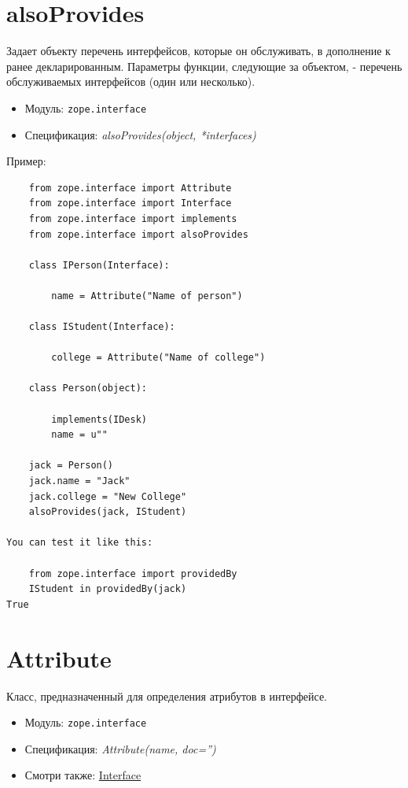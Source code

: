 \documentclass[a4paper,openany,twoside,draft]{book}
\providecommand*{\DUroletitlereference}[1]{\textsl{#1}}
\begin{document}
\section*{alsoProvides%
  \label{alsoprovides}%
}

Задает объекту перечень интерфейсов, которые он обслуживать, в дополнение к ранее декларированным.  Параметры функции, следующие за объектом, - перечень обслуживаемых интерфейсов (один или несколько).

\begin{itemize}

\item Модуль: \texttt{zope.interface}

\item Спецификация: \DUroletitlereference{alsoProvides(object, *interfaces)}

\end{itemize}

Пример:

\begin{verbatim}
    from zope.interface import Attribute
    from zope.interface import Interface
    from zope.interface import implements
    from zope.interface import alsoProvides

    class IPerson(Interface):

        name = Attribute("Name of person")

    class IStudent(Interface):

        college = Attribute("Name of college")

    class Person(object):

        implements(IDesk)
        name = u""

    jack = Person()
    jack.name = "Jack"
    jack.college = "New College"
    alsoProvides(jack, IStudent)

You can test it like this:

    from zope.interface import providedBy
    IStudent in providedBy(jack)
True
\end{verbatim}


\section*{Attribute%
  \label{attribute}%
}

Класс, предназначенный для определения атрибутов в интерфейсе.

\begin{itemize}

\item Модуль: \texttt{zope.interface}

\item Спецификация: \DUroletitlereference{Attribute(name, doc='')}

\item Смотри также: \hyperref[interface]{Interface}

\end{itemize}
\end{document}
